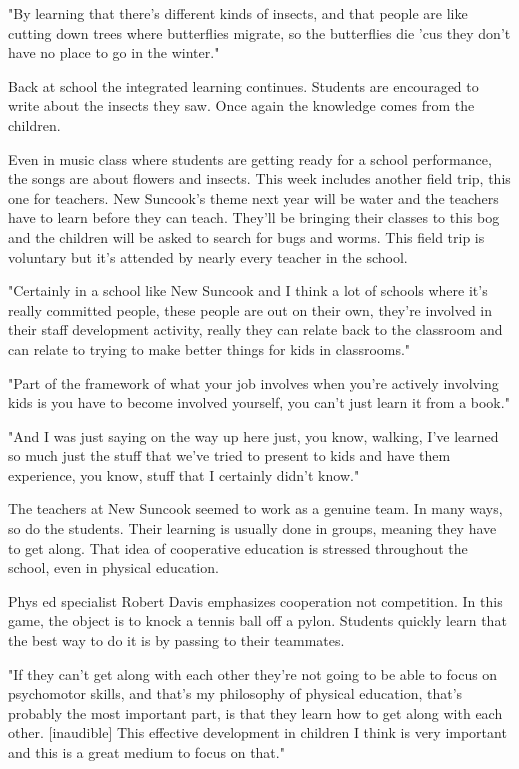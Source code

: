 "By learning that there's different kinds of insects, and that people are like cutting down trees where butterflies migrate, so the butterflies die 'cus they don't have no place to go in the winter."

Back at school the integrated learning continues. Students are encouraged to write about the insects they saw. Once again the knowledge comes from the children.

Even in music class where students are getting ready for a school performance, the songs are about flowers and insects. This week includes another field trip, this one for teachers. New Suncook's theme next year will be water and the teachers have to learn before they can teach. They'll be bringing their classes to this bog and the children will be asked to search for bugs and worms. This field trip is voluntary but it's attended by nearly every teacher in the school.

"Certainly in a school like New Suncook and I think a lot of schools where it's really committed people, these people are out on their own, they're involved in their staff development activity, really they can relate back to the classroom and can relate to trying to make better things for kids in classrooms."

"Part of the framework of what your job involves when you're actively involving kids is you have to become involved yourself, you can't just learn it from a book."

"And I was just saying on the way up here just, you know, walking, I've learned so much just the stuff that we've tried to present to kids and have them experience, you know, stuff that I certainly didn't know."

The teachers at New Suncook seemed to work as a genuine team. In many ways, so do the students. Their learning is usually done in groups, meaning they have to get along. That idea of cooperative education is stressed throughout the school, even in physical education.

Phys ed specialist Robert Davis emphasizes cooperation not competition. In this game, the object is to knock a tennis ball off a pylon. Students quickly learn that the best way to do it is by passing to their teammates.

"If they can't get along with each other they're not going to be able to focus on psychomotor skills, and that's my philosophy of physical education, that's probably the most important part, is that they learn how to get along with each other. [inaudible] This effective development in children I think is very important and this is a great medium to focus on that."

